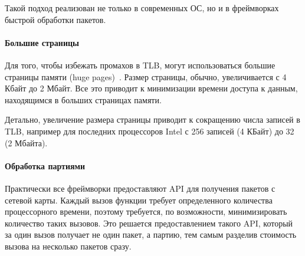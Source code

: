 Такой подход реализован не только в современных ОС, но и в фреймворках быстрой обработки пакетов.

\paragraph{Большие страницы}

Для того, чтобы избежать промахов в TLB, могут использоваться большие страницы памяти (huge pages)~\cite{linux_programming}. Размер страницы, обычно, увеличивается с 4 Кбайт до 2 Мбайт. Все это приводит к минимизации времени доступа к данным, находящимся в больших страницах памяти.

Детально, увеличение размера страницы приводит к сокращению числа записей в TLB, например для последних процессоров Intel с 256 записей (4 КБайт) до 32 (2 Мбайта).

\paragraph{Обработка партиями}

Практически все фреймворки предоставляют API для получения пакетов с сетевой карты.  Каждый вызов функции требует определенного количества процессорного времени, поэтому требуется, по возможности, минимизировать количество таких вызовов. Это решается предоставлением такого API, который за один вызов получает не один пакет, а партию, тем самым разделив стоимость вызова на несколько пакетов сразу.

